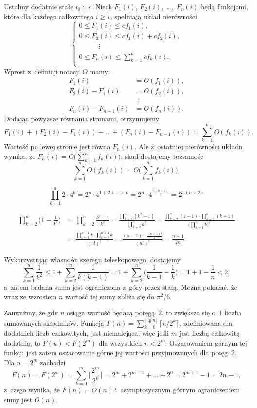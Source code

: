 Ustalmy dodatnie stałe $i_0$ i~$c$. Niech $F_1(i)$, $F_2(i)$,~\dots,~$F_n(i)$ będą funkcjami, które dla każdego całkowitego $i\ge i_0$ spełniają układ nierówności
\[
	\begin{cases}
		0 \le F_1(i) \le cf_1(i), \\
		0 \le F_2(i) \le cf_1(i)+cf_2(i), \\
		\phantom{0 \le F_2} \vdots \\
		0 \le F_n(i) \le \sum_{k=1}^ncf_k(i). \\
	\end{cases}
\]
Wprost z~definicji notacji $O$ mamy:
\begin{align*}
	F_1(i) &= O(f_1(i)), \\
	F_2(i)-F_1(i) &= O(f_2(i)), \\
	& \,\,\,\vdots \\
	F_n(i)-F_{n-1}(i) &= O(f_n(i)).
\end{align*}
Dodając powyższe równania stronami, otrzymujemy
\[
	F_1(i)+(F_2(i)-F_1(i))+\dots+(F_n(i)-F_{n-1}(i)) = \sum_{k=1}^nO(f_k(i)).
\]
Wartość po lewej stronie jest równa $F_n(i)$. Ale z~ostatniej nierówności układu wynika, że $F_n(i)=O\bigl(\sum_{k=1}^nf_k(i)\bigr)$, skąd dostajemy tożsamość
\[
	\sum_{k=1}^nO(f_k(i)) = O\biggl(\sum_{k=1}^nf_k(i)\biggr).
\]

\exercise %
\[
	\prod_{k=1}^n2\cdot4^k = 2^n\cdot4^{1+2+\dots+n} = 2^n\cdot4^{\frac{n(n+1)}{2}} = 2^{n(n+2)}
\]

\exercise %
\begin{align*}
	\prod_{k=2}^n\biggl(1-\frac{1}{k^2}\biggr) &= \prod_{k=2}^n\frac{k^2-1}{k^2} = \frac{\prod_{k=2}^n(k^2-1)}{\prod_{k=2}^nk^2} = \frac{\prod_{k=2}^n(k-1)\cdot\prod_{k=2}^n(k+1)}{\bigl(\prod_{k=1}^nk\bigr)^2} \\[2mm]
	&= \frac{\prod_{k=1}^{n-1}k\cdot\prod_{k=3}^{n+1}k}{(n!)^2} = \frac{(n-1)!\cdot\frac{(n+1)!}{2}}{(n!)^2} = \frac{n+1}{2n}
\end{align*}


\exercise %
Wykorzystując własności szeregu teleskopowego, dostajemy
\[
	\sum_{k=1}^n\frac{1}{k^2} \le 1+\sum_{k=2}^n\frac{1}{k(k-1)} = 1+\sum_{k=2}^n\biggl(\frac{1}{k-1}-\frac{1}{k}\biggr) = 1+1-\frac{1}{n} < 2,
\]
a~zatem badana suma jest ograniczona z~góry przez stałą. Można pokazać, że wraz ze wzrostem $n$ wartość tej sumy zbliża się do $\pi^2\!/6$.

\exercise %
Zauważmy, że gdy $n$ osiąga wartość będącą potęgą~2, to zwiększa się o~1 liczba sumowanych składników. Funkcja $F(n)=\sum_{k=0}^{\lfloor\lg n\rfloor}\bigl\lceil n/2^k\bigr\rceil$, zdefiniowana dla dodatnich liczb całkowitych, jest niemalejąca, więc jeśli $m$ jest liczbą całkowitą dodatnią, to $F(n)<F(2^m)$ dla wszystkich $n<2^m$. Oszacowaniem górnym tej funkcji jest zatem oszacowanie górne jej wartości przyjmowanych dla potęg~2. Dla $n=2^m$ zachodzi
\[
	F(n) = F(2^m) = \sum_{k=0}^m\biggl\lceil\frac{2^m}{2^k}\biggr\rceil = 2^m+2^{m-1}+\dots+2^0 = 2^{m+1}-1 = 2n-1,
\]
z~czego wynika, że $F(n)=O(n)$ i~asymptotycznym górnym ograniczeniem sumy jest $O(n)$.

